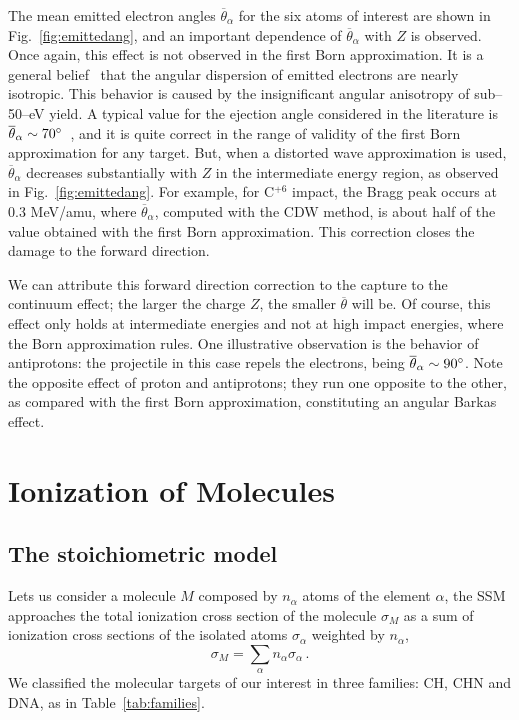 \documentclass[preprint]{revtex4-2}
\begin{document}
The mean emitted electron angles $\overline{\theta}_{\alpha}$ for the 
six atoms of interest are shown in Fig.~\ref{fig:emittedang}, and an 
important dependence of $\overline{\theta}_{\alpha}$ with $Z$ is 
observed. Once again, this effect is not observed in the first Born 
approximation. It is a general belief~\cite{Rudd1992} that the 
angular dispersion of emitted electrons are nearly isotropic. This 
behavior is caused by the insignificant angular anisotropy of 
sub--50--eV yield. 
A typical value for the ejection angle considered in the literature is 
$\overline{\theta}_{\alpha}\sim 70\degree$~\cite{surdutovic2018}, and 
it is quite correct in the range of validity of the first Born 
approximation for any target. But, when a distorted wave approximation 
is used, $\overline{\theta}_{\alpha}$ decreases substantially with $Z$ 
in the intermediate energy region, as observed in Fig.~\ref{fig:emittedang}. 
For example, for C$^{+6}$ impact, the Bragg peak occurs at 0.3 MeV/amu, 
where $\overline{\theta}_{\alpha}$, computed with the CDW method, is 
about half of the value obtained with the first Born approximation. 
This correction closes the damage to the forward direction.

We can attribute this forward direction correction to the capture to 
the continuum effect; the larger the charge $Z$, the smaller 
$\overline{\theta}$ will be. Of course, this effect only holds at 
intermediate energies and not at high impact energies, where the Born 
approximation rules. One illustrative observation is the behavior of 
antiprotons: the projectile in this case repels the electrons, being
$\overline{\theta}_{\alpha}\sim 90\degree$.
Note the opposite effect of proton and antiprotons; they run one 
opposite to the other, as compared with the first Born approximation,
constituting an angular Barkas effect.


\section{Ionization of Molecules}
\subsection{The stoichiometric model}

Lets us consider a molecule $M$ composed by $n_{\alpha}$ atoms of the
element $\alpha$, the SSM approaches the total ionization cross section 
of the molecule $\sigma_{M}$ as a sum of ionization cross sections of 
the isolated atoms $\sigma_{\alpha}$ weighted by $n_{\alpha}$, 
\begin{equation}
 \sigma_{M}=\sum\limits_{\alpha}n_{\alpha}\sigma_{\alpha}\,.  
 \label{eq:sumion}
\end{equation}
We classified the molecular targets of our interest in three families: 
CH, CHN and DNA, as in Table~\ref{tab:families}.
\end{document}
